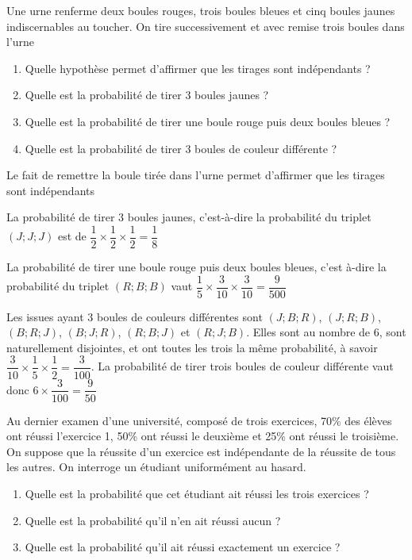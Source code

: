 \documentclass[11pt,fleqn, openany]{book} %
\begin{document}
\begin{exercise}[topic=prob11]Une urne renferme deux boules rouges, trois boules bleues et cinq boules jaunes indiscernables au toucher. On tire successivement et avec remise trois boules dans l'urne
\begin{enumerate}
\item Quelle hypothèse permet d'affirmer que les tirages sont indépendants ?
\item Quelle est la probabilité de tirer 3 boules jaunes ?
\item Quelle est la probabilité de tirer une boule rouge puis deux boules bleues ?
\item Quelle est la probabilité de tirer 3 boules de couleur différente ?
\end{enumerate}\end{exercise}

\begin{solution}Le fait de remettre la boule tirée dans l'urne permet d'affirmer que les tirages sont indépendants

La probabilité de tirer 3 boules jaunes, c'est-à-dire la probabilité du triplet $(J;J;J)$ est de $\dfrac{1}{2} \times \dfrac{1}{2} \times \dfrac{1}{2}=\dfrac{1}{8}$

La probabilité de tirer une boule rouge puis deux boules bleues, c'est à-dire la probabilité du triplet $(R;B;B)$ vaut $\dfrac{1}{5} \times \dfrac{3}{10} \times \dfrac{3}{10}=\dfrac{9}{500}$

Les issues ayant 3 boules de couleurs différentes sont $(J;B;R)$, $(J;R;B)$, $(B;R;J)$, $(B;J;R)$, $(R;B;J)$ et $(R;J;B)$. Elles sont au nombre de 6, sont naturellement disjointes, et ont toutes les trois la même probabilité, à savoir $\dfrac{3}{10} \times 	\dfrac{1}{5} \times \dfrac{1}{2} = \dfrac{3}{100}$. La probabilité de tirer trois boules de couleur différente vaut donc $6 \times \dfrac{3}{100} = \dfrac{9}{50}$\end{solution}




\begin{exercise}[topic=prob11]Au dernier examen d'une université, composé de trois exercices, 70\% des élèves ont réussi l'exercice 1, 50\% ont réussi le deuxième et 25\% ont réussi le troisième. On suppose que la réussite d'un exercice est indépendante de la réussite de tous les autres. On interroge un étudiant uniformément au hasard.
\begin{enumerate}
\item Quelle est la probabilité que cet étudiant ait réussi les trois exercices ?
\item Quelle est la probabilité qu'il n'en ait réussi aucun ?
\item Quelle est la probabilité qu'il ait réussi exactement un exercice ?
\end{enumerate}\end{exercise}
\end{document}
